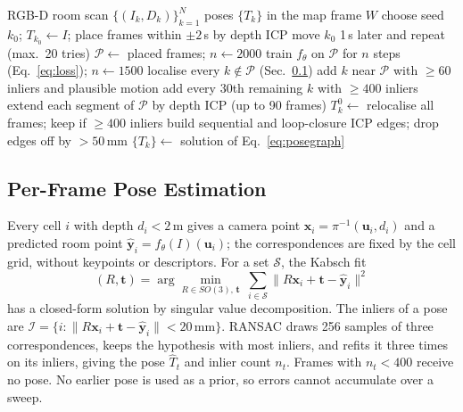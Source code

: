 \documentclass[journal]{IEEEtran}
\begin{document}
\begin{algorithm}[t]
  \caption{Self-mapping of a room scan}
  \label{alg:mapping}
  \small
  \begin{algorithmic}[1]
    \Require RGB-D room scan $\{(I_k,D_k)\}_{k=1}^{N}$
    \Ensure poses $\{T_k\}$ in the map frame $W$
    \State choose seed $k_0$; $T_{k_0}\gets I$; place frames within $\pm2$\,s by depth ICP
     move $k_0$ 1\,s later and repeat (max.\ 20 tries) \EndIf
    \State $\mathcal{P}\gets$ placed frames; $n\gets2000$
    \Repeat
      \State train $f_\theta$ on $\mathcal{P}$ for $n$ steps (Eq.~\eqref{eq:loss}); $n\gets1500$
      \State localise every $k\notin\mathcal{P}$ (Sec.~\ref{sec:pose})
      \State add $k$ near $\mathcal{P}$ with $\ge60$ inliers and plausible motion
      \State add every 30th remaining $k$ with $\ge400$ inliers
      \State extend each segment of $\mathcal{P}$ by depth ICP (up to 90 frames)
    \State $T^0_k\gets$ relocalise all frames; keep if $\ge400$ inliers
    \State build sequential and loop-closure ICP edges; drop edges off by $>50$\,mm
    \State \Return $\{T_k\}\gets$ solution of Eq.~\eqref{eq:posegraph}
  \end{algorithmic}
\end{algorithm}

\subsection{Per-Frame Pose Estimation}
\label{sec:pose}
Every cell $i$ with depth $d_i<2$\,m gives a camera point $\mathbf{x}_i=\pi^{-1}(\mathbf{u}_i,d_i)$ and a predicted room point $\hat{\mathbf{y}}_i=f_\theta(I)(\mathbf{u}_i)$; the correspondences are fixed by the cell grid, without keypoints or descriptors. For a set $\mathcal{S}$, the Kabsch fit \cite{kabsch1976}
\begin{equation}
  (R,\mathbf{t})=\arg\min_{R\in SO(3),\,\mathbf{t}}\ \sum_{i\in\mathcal{S}}\|R\mathbf{x}_i+\mathbf{t}-\hat{\mathbf{y}}_i\|^2
  \label{eq:kabsch}
\end{equation}
has a closed-form solution by singular value decomposition. The inliers of a pose are $\mathcal{I}=\{i:\|R\mathbf{x}_i+\mathbf{t}-\hat{\mathbf{y}}_i\|<20\,\mathrm{mm}\}$. RANSAC \cite{fischler1981ransac} draws 256 samples of three correspondences, keeps the hypothesis with most inliers, and refits it three times on its inliers, giving the pose $\hat T_t$ and inlier count $n_t$. Frames with $n_t<400$ receive no pose. No earlier pose is used as a prior, so errors cannot accumulate over a sweep.
\end{document}
